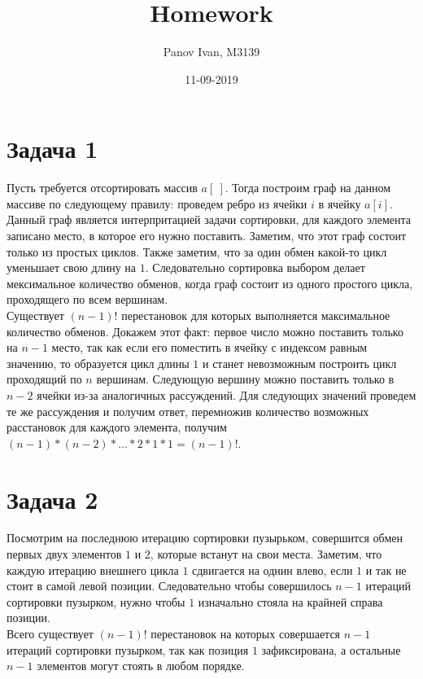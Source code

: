 \documentclass{article}
\title{Homework}
\date{11-09-2019}
\author{Panov Ivan, M3139}
\begin{document}
	
	\maketitle
	\newpage
	
	\section*{Задача 1}
	Пусть требуется отсортировать массив $a[\ ]$. Тогда построим граф на данном массиве по следующему правилу: проведем ребро из ячейки $i$ в ячейку $a[i]$. Данный граф является интерпритацией задачи сортировки, для каждого элемента записано место, в которое его нужно поставить. Заметим, что этот граф состоит только из простых циклов. Также заметим, что за один обмен какой-то цикл уменьшает свою длину на $1$. Следовательно сортировка выбором делает мексимальное количество обменов, когда граф состоит из одного простого цикла, проходящего по всем вершинам. 
	\\
	Существует $(n - 1)!$ перестановок для которых выполняется максимальное количество обменов. Докажем этот факт: первое число можно поставить только на $n - 1$ место, так как если его поместить в ячейку с индексом равным значению, то образуется цикл длины $1$ и станет невозможным построить цикл проходящий по $n$ вершинам. Следующую вершину можно поставить только в $n - 2$ ячейки из-за аналогичных рассуждений. Для следующих значений проведем те же рассуждения и получим ответ, перемножив количество возможных расстановок для каждого элемента, получим $(n - 1) * (n - 2) * ... * 2 * 1 * 1 = (n - 1)!$.  
	
	\section*{Задача 2}
	Посмотрим на последнюю итерацию сортировки пузырьком, совершится обмен первых двух элементов $1$ и $2$, которые встанут на свои места. Заметим, что каждую итерацию внешнего цикла $1$ сдвигается на однин влево, если $1$ и так не стоит в самой левой позиции. Следовательно чтобы совершилось $n - 1$ итераций сортировки пузырком, нужно чтобы $1$ изначально стояла на крайней справа позиции. 
	\\
	Всего существует $(n - 1)!$ перестановок на которых совершается $n - 1$ итераций сортировки пузырком, так как позиция $1$ зафиксирована, а остальные $n - 1$ элементов могут стоять в любом порядке.
	
\end{document}

